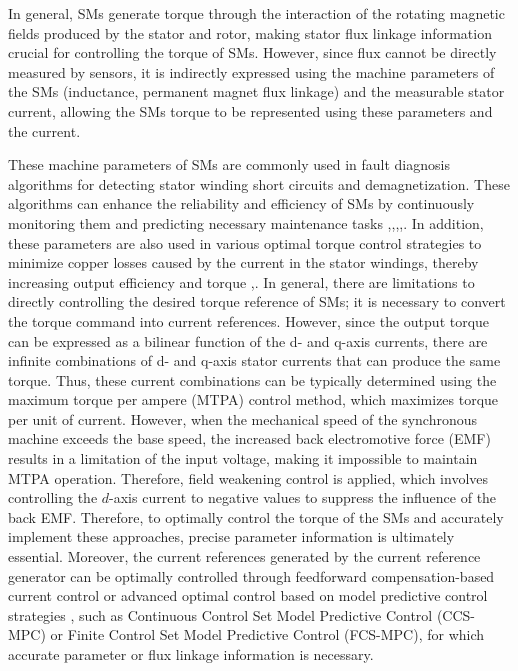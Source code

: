 In general, SMs generate torque through the interaction of the rotating magnetic fields produced by the stator and rotor, making stator flux linkage information crucial for controlling the torque of SMs. However, since flux cannot be directly measured by sensors, it is indirectly expressed using the machine parameters of the SMs (inductance, permanent magnet flux linkage) and the measurable stator current, allowing the SMs torque to be represented using these parameters and the current. 

These machine parameters of SMs are commonly used in fault diagnosis algorithms for detecting stator winding short circuits and demagnetization. These algorithms can enhance the reliability and efficiency of SMs by continuously monitoring them and predicting necessary maintenance tasks \cite{c1_9},\cite{c1_10},\cite{c1_11},\cite{c1_12},\cite{c1_13}. In addition, these parameters are also used in various optimal torque control strategies to minimize copper losses caused by the current in the stator windings, thereby increasing output efficiency and torque \cite{c1_2},\cite{c1_14}. In general, there are limitations to directly controlling the desired torque reference of SMs; it is necessary to convert the torque command into current references. However, since the output torque can be expressed as a bilinear function of the d- and q-axis currents, there are infinite combinations of d- and q-axis stator currents that can produce the same torque. Thus, these current combinations can be typically determined using the maximum torque per ampere (MTPA) control method, which maximizes torque per unit of current. However, when the mechanical speed of the synchronous machine exceeds the base speed, the increased back electromotive force (EMF) results in a limitation of the input voltage, making it impossible to maintain MTPA operation. Therefore, field weakening control is applied, which involves controlling the $d$-axis current to negative values to suppress the influence of the back EMF. Therefore, to optimally control the torque of the SMs and accurately implement these approaches, precise parameter information is ultimately essential. Moreover, the current references generated by the current reference generator can be optimally controlled through feedforward compensation-based current control or advanced optimal control based on model predictive control strategies \cite{c1_15},\cite{c1_16} such as Continuous Control Set Model Predictive Control (CCS-MPC) or Finite Control Set Model Predictive Control (FCS-MPC), for which accurate parameter or flux linkage information is necessary.

